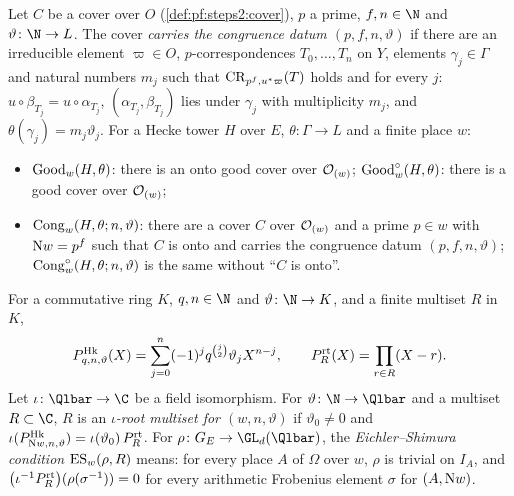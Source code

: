 \begin{definition}\label{def:pf:steps2:cong}
Let $C$ be a cover over $O$ (\cref{def:pf:steps2:cover}), $p$ a prime, $f,n\in\N$ and
$\vartheta\colon\N\to L$. The cover \emph{carries the congruence datum $(p,f,n,\vartheta)$} if there
are an irreducible element $\varpi\in O$, $p$-correspondences $T_0,\dots,T_n$ on $Y$, elements
$\gamma_j\in\Gamma$ and natural numbers $m_j$ such that $\mathrm{CR}_{p^f,u^\ast\varpi}(T)$ holds and
for every $j$: $u\circ\beta_{T_j}=u\circ\alpha_{T_j}$, $(\alpha_{T_j},\beta_{T_j})$ lies under
$\gamma_j$ with multiplicity $m_j$, and $\theta(\gamma_j)=m_j\vartheta_j$. For a Hecke tower $H$ over
$E$, $\theta\colon\Gamma\to L$ and a finite place $w$:
\begin{itemize}[nosep]
\item $\mathrm{Good}_w(H,\theta)$: there is an onto good cover over $\mathcal{O}_{(w)}$;
  $\mathrm{Good}^\circ_w(H,\theta)$: there is a good cover over $\mathcal{O}_{(w)}$;
\item $\mathrm{Cong}_w(H,\theta;n,\vartheta)$: there are a cover $C$ over $\mathcal{O}_{(w)}$ and a prime $p\in
  w$ with $\mathrm{N}w=p^f$ such that $C$ is onto and carries the congruence datum
  $(p,f,n,\vartheta)$; $\mathrm{Cong}^\circ_w(H,\theta;n,\vartheta)$ is the same without ``$C$ is
  onto''.
\end{itemize}
\end{definition}

\begin{definition}\label{def:pf:steps2:es}
For a commutative ring $K$, $q,n\in\N$ and $\vartheta\colon\N\to K$, and a finite multiset $R$ in
$K$,
\[
  P^{\mathrm{Hk}}_{q,n,\vartheta}(X)=\sum_{j=0}^n(-1)^jq^{\binom j2}\vartheta_jX^{n-j},\qquad
  P^{\mathrm{rt}}_R(X)=\prod_{r\in R}(X-r).
\]
Let $\iota\colon\Qlbar\to\C$ be a field isomorphism. For $\vartheta\colon\N\to\Qlbar$ and a multiset
$R\subset\C$, $R$ is an \emph{$\iota$-root multiset for $(w,n,\vartheta)$} if $\vartheta_0\ne0$ and
$\iota(P^{\mathrm{Hk}}_{\mathrm{N}w,n,\vartheta})=\iota(\vartheta_0)\,P^{\mathrm{rt}}_R$. For
$\rho\colon G_E\to\GL_d(\Qlbar)$, the \emph{Eichler--Shimura condition} $\mathrm{ES}_w(\rho,R)$ means:
for every place $A$ of $\Omega$ over $w$, $\rho$ is trivial on $I_A$, and
$\bigl(\iota^{-1}P^{\mathrm{rt}}_R\bigr)(\rho(\sigma^{-1}))=0$ for every arithmetic Frobenius element
$\sigma$ for $(A,\mathrm{N}w)$.
\end{definition}

